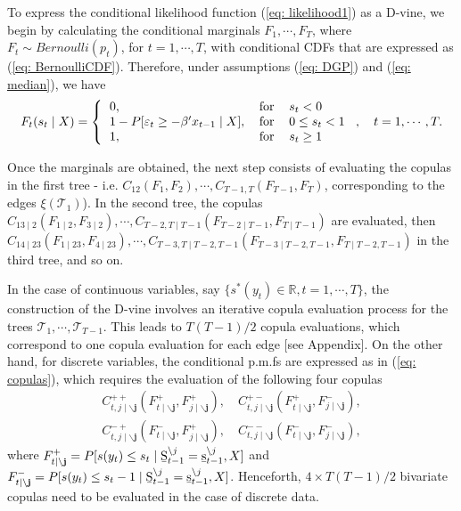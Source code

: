 \documentclass[harvard,11pt]{article}
\begin{document}
To express the conditional likelihood function (\ref{eq: likelihood1}) as a D-vine, we begin by calculating the conditional marginals $F_1,\cdots,F_T$, where $F_t\sim Bernoulli(p_t)$, for $t=1,\cdots,T$, with conditional CDFs that are expressed as (\ref{eq: BernoulliCDF}). Therefore, under assumptions (\ref{eq: DGP}) and (\ref{eq: median}), we have
\begin{equation}\label{eq: BernoulliCDF2}
F_t(s_t\mid X)=\left\{ 
\begin{tabular}{lll}
$0,$ &$\text{for}$& $s_t< 0$ \\ 
$1-P[\varepsilon_t\geq  -\beta' x_{t-1}\mid X],$ &$\text{for}$ &$0\leq s_t< 1$ \\
$1,$& $\text{for}$& $s_t\geq 1$
\end{tabular}%
\right.,\quad t=1,\cdots,T.
\end{equation} 
\begin{sloppypar}
Once the marginals are obtained, the next step consists of evaluating the copulas in the first tree - i.e. $C_{12}(F_1,F_2),\cdots,C_{T-1,T}(F_{T-1},F_T)$, corresponding to the edges $\xi(\mathcal{T}_1)$). In the second tree, the copulas $C_{13\mid 2}(F_{1\mid 2},F_{3\mid 2}),\cdots,C_{T-2,T \mid T-1}(F_{T-2\mid T-1},F_{T\mid T-1})$ are evaluated, then $C_{14\mid 23}(F_{1\mid 23},F_{4\mid 23}),\cdots,C_{T-3,T\mid T-2,T-1}(F_{T-3\mid T-2,T-1},F_{T\mid T-2,T-1})$ in the third tree, and so on. 
\end{sloppypar}

In the case of continuous variables, say $\{s^*(y_t)\in \mathbb{R},t=1,\cdots,T\}$, the construction of the D-vine involves an iterative copula evaluation process for the trees $\mathcal{T}_1,\cdots,\mathcal{T}_{T-1}$. This leads to $T(T-1)/2$ copula evaluations, which correspond to one copula evaluation for each edge [see Appendix]. On the other hand, for discrete variables, the conditional p.m.fs are expressed as in (\ref{eq: copulas}), which requires the evaluation of the following four copulas
\begingroup
\allowdisplaybreaks
\begin{align*}
C_{t,j\mid \mathbf{\backslash j}}^{++}(F_{t\mid \mathbf{\backslash j}}^+,F_{j\mid \mathbf{\backslash j}}^+),\quad C_{t,j\mid \mathbf{\backslash j}}^{+-}(F_{t\mid \mathbf{\backslash j}}^+,F_{j\mid \mathbf{\backslash j}}^-),\\
C_{t,j\mid \mathbf{\backslash j}}^{-+}(F_{t\mid \mathbf{\backslash j}}^-,F_{j\mid \mathbf{\backslash j}}^+),\quad C_{t,j\mid \mathbf{\backslash j}}^{--}(F_{t\mid \mathbf{\backslash j}}^-,F_{j\mid \mathbf{\backslash j}}^-),
\end{align*}
\endgroup
where $F_{t\mid \mathbf{\backslash j}}^+=P[s(y_t)\leq s_t \mid\text{\b{S}}_{t-1}^{\backslash j}=\text{\b{s}}_{t-1}^{\backslash j},X]$ and $F_{t\mid \mathbf{\backslash j}}^-=P[s(y_t)\leq s_t-1 \mid\text{\b{S}}_{t-1}^{\backslash j}=\text{\b{s}}_{t-1}^{\backslash j},X]$. Henceforth, $4\times T(T-1)/2$ bivariate copulas need to be evaluated in the case of discrete data. 
\end{document}
